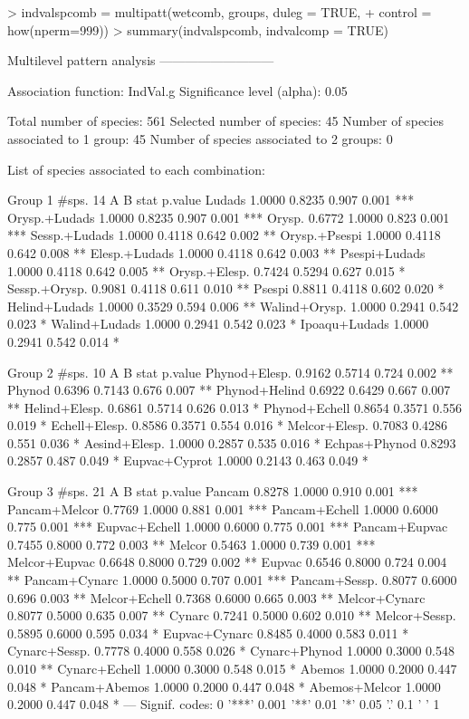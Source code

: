 \documentclass[11pt,a4paper]{article}
\begin{document}
\begin{Schunk}
\begin{Sinput}
> indvalspcomb = multipatt(wetcomb, groups, duleg = TRUE, 
+                        control = how(nperm=999))
> summary(indvalspcomb, indvalcomp = TRUE)
\end{Sinput}
\begin{Soutput}
 Multilevel pattern analysis
 ---------------------------

 Association function: IndVal.g
 Significance level (alpha): 0.05

 Total number of species: 561
 Selected number of species: 45 
 Number of species associated to 1 group: 45 
 Number of species associated to 2 groups: 0 

 List of species associated to each combination: 

 Group 1  #sps.  14 
                   A      B  stat p.value    
Ludads        1.0000 0.8235 0.907   0.001 ***
Orysp.+Ludads 1.0000 0.8235 0.907   0.001 ***
Orysp.        0.6772 1.0000 0.823   0.001 ***
Sessp.+Ludads 1.0000 0.4118 0.642   0.002 ** 
Orysp.+Psespi 1.0000 0.4118 0.642   0.008 ** 
Elesp.+Ludads 1.0000 0.4118 0.642   0.003 ** 
Psespi+Ludads 1.0000 0.4118 0.642   0.005 ** 
Orysp.+Elesp. 0.7424 0.5294 0.627   0.015 *  
Sessp.+Orysp. 0.9081 0.4118 0.611   0.010 ** 
Psespi        0.8811 0.4118 0.602   0.020 *  
Helind+Ludads 1.0000 0.3529 0.594   0.006 ** 
Walind+Orysp. 1.0000 0.2941 0.542   0.023 *  
Walind+Ludads 1.0000 0.2941 0.542   0.023 *  
Ipoaqu+Ludads 1.0000 0.2941 0.542   0.014 *  

 Group 2  #sps.  10 
                   A      B  stat p.value   
Phynod+Elesp. 0.9162 0.5714 0.724   0.002 **
Phynod        0.6396 0.7143 0.676   0.007 **
Phynod+Helind 0.6922 0.6429 0.667   0.007 **
Helind+Elesp. 0.6861 0.5714 0.626   0.013 * 
Phynod+Echell 0.8654 0.3571 0.556   0.019 * 
Echell+Elesp. 0.8586 0.3571 0.554   0.016 * 
Melcor+Elesp. 0.7083 0.4286 0.551   0.036 * 
Aesind+Elesp. 1.0000 0.2857 0.535   0.016 * 
Echpas+Phynod 0.8293 0.2857 0.487   0.049 * 
Eupvac+Cyprot 1.0000 0.2143 0.463   0.049 * 

 Group 3  #sps.  21 
                   A      B  stat p.value    
Pancam        0.8278 1.0000 0.910   0.001 ***
Pancam+Melcor 0.7769 1.0000 0.881   0.001 ***
Pancam+Echell 1.0000 0.6000 0.775   0.001 ***
Eupvac+Echell 1.0000 0.6000 0.775   0.001 ***
Pancam+Eupvac 0.7455 0.8000 0.772   0.003 ** 
Melcor        0.5463 1.0000 0.739   0.001 ***
Melcor+Eupvac 0.6648 0.8000 0.729   0.002 ** 
Eupvac        0.6546 0.8000 0.724   0.004 ** 
Pancam+Cynarc 1.0000 0.5000 0.707   0.001 ***
Pancam+Sessp. 0.8077 0.6000 0.696   0.003 ** 
Melcor+Echell 0.7368 0.6000 0.665   0.003 ** 
Melcor+Cynarc 0.8077 0.5000 0.635   0.007 ** 
Cynarc        0.7241 0.5000 0.602   0.010 ** 
Melcor+Sessp. 0.5895 0.6000 0.595   0.034 *  
Eupvac+Cynarc 0.8485 0.4000 0.583   0.011 *  
Cynarc+Sessp. 0.7778 0.4000 0.558   0.026 *  
Cynarc+Phynod 1.0000 0.3000 0.548   0.010 ** 
Cynarc+Echell 1.0000 0.3000 0.548   0.015 *  
Abemos        1.0000 0.2000 0.447   0.048 *  
Pancam+Abemos 1.0000 0.2000 0.447   0.048 *  
Abemos+Melcor 1.0000 0.2000 0.447   0.048 *  
---
Signif. codes:  0 '***' 0.001 '**' 0.01 '*' 0.05 '.' 0.1 ' ' 1 
\end{Soutput}
\end{Schunk}
\end{document}
